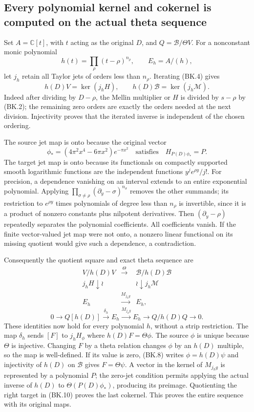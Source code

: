 \subsection{Every polynomial kernel and cokernel is computed on the actual theta sequence}

Set $A=\mathbb C[t]$, with $t$ acting as the original $D$, and
$Q=\mathscr B/\Theta V$.  For a nonconstant monic polynomial
\[
 h(t)=\prod_\rho(t-\rho)^{n_\rho},\qquad
 E_h=A/(h),
\]
let $j_h$ retain all Taylor jets of orders less than $n_\rho$.
Iterating (BK.4) gives
\[
 h(D)V=\ker(j_hH),\qquad
 h(D)\mathscr B=\ker(j_h\mathcal M).             \tag{BK.8}
\]
Indeed after dividing by $D-\rho$, the Mellin multiplier or $H$
is divided by $s-\rho$ by (BK.2); the remaining zero orders are
exactly the orders needed at the next division.  Injectivity proves
that the iterated inverse is independent of the chosen ordering.

The source jet map is onto because the original vector
\[
 \phi_*=(4\pi^2x^4-6\pi x^2)e^{-\pi x^2}
 \quad\text{satisfies}\quad H_{P(D)\phi_*}=P.    \tag{BK.9}
\]
The target jet map is onto because its functionals on compactly
supported smooth logarithmic functions are the independent functions
$y^j e^{\rho y}/j!$.  For precision, a dependence vanishing on
an interval extends to an entire exponential polynomial.  Applying
$\prod_{\sigma\ne\rho}(\partial_y-\sigma)^{n_\sigma}$ removes
the other summands; its restriction to $e^{\rho y}$ times
polynomials of degree less than $n_\rho$ is invertible, since it
is a product of nonzero constants plus nilpotent derivatives.
Then $(\partial_y-\rho)$ repeatedly separates the polynomial
coefficients.  All coefficients vanish.  If the finite vector-valued
jet map were not onto, a nonzero linear functional on its missing
quotient would give such a dependence, a contradiction.

Consequently the quotient square and exact theta sequence are
\[
 \begin{array}{ccc}
 V/h(D)V&\xrightarrow{\Theta}&\mathscr B/h(D)\mathscr B\\
 j_hH\downarrow\wr&&\wr\downarrow j_h\mathcal M\\
 E_h&\xrightarrow{M_{j_hg}}&E_h,
 \end{array}                                                    \tag{BK.10}
\]
\[
 0\longrightarrow Q[h(D)]\xrightarrow{\delta_h}E_h
 \xrightarrow{M_{j_hg}}E_h\longrightarrow Q/h(D)Q\longrightarrow0.
                                                               \tag{BK.11}
\]
These identities now hold for every polynomial $h$, without a
strip restriction.  The map $\delta_h$ sends $[F]$ to $j_hH_\phi$
where $h(D)F=\Theta\phi$.  The source $\phi$ is unique because
$\Theta$ is injective.  Changing $F$ by a theta relation changes
$\phi$ by an $h(D)$ multiple, so the map is well-defined.
If its value is zero, (BK.8) writes $\phi=h(D)\psi$ and
injectivity of $h(D)$ on $\mathscr B$ gives $F=\Theta\psi$.
A vector in the kernel of $M_{j_hg}$ is represented by a polynomial
$P$; the zero-jet condition permits applying the actual inverse of
$h(D)$ to $\Theta(P(D)\phi_*)$, producing its preimage.
Quotienting the right target in (BK.10) proves the last cokernel.
This proves the entire sequence with its original maps.

